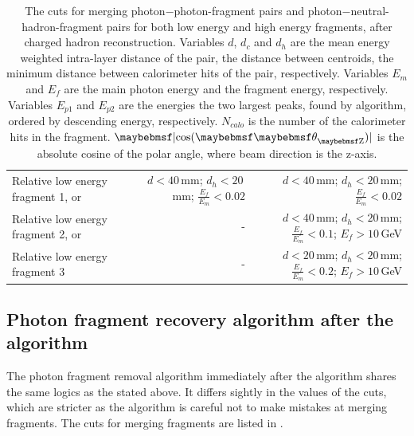 \begin{table}[htbp]
\begin{tabular}{l  r  r }
\multicolumn{1}{L{0.3\textwidth}}{Relative low energy fragment 1, or} & \multicolumn{1}{R{0.3\textwidth}}{$d < 40$\,mm; $d_h < 20$\,mm; $\frac{E_f}{E_m} < 0.02$} & \multicolumn{1}{R{0.3\textwidth}}{$d < 40$\,mm; $d_h < 20$\,mm; $\frac{E_f}{E_m} < 0.02$} \\
\multicolumn{1}{L{0.3\textwidth}}{Relative low energy fragment 2, or} & \multicolumn{1}{R{0.3\textwidth}}{-}  & \multicolumn{1}{R{0.3\textwidth}}{$d < 40$\,mm; $d_h < 20$\,mm; $\frac{E_f}{E_m} < 0.1$; $E_f > 10$\,GeV} \\
\multicolumn{1}{L{0.3\textwidth}}{Relative low energy fragment 3} & \multicolumn{1}{R{0.3\textwidth}}{-}  & \multicolumn{1}{R{0.3\textwidth}}{$d < 20$\,mm; $d_h < 20$\,mm; $\frac{E_f}{E_m} < 0.2$; $E_f > 10$\,GeV} \\
\hline
\hline
\end{tabular}

\caption[The cuts for photon fragment removal algorithm in the \ECAL.]%
{The cuts for merging photon$-$photon-fragment pairs and photon$-$neutral-hadron-fragment pairs for both low energy and high energy fragments, after charged hadron reconstruction. Variables $d$, $d_c$ and $d_h$ are the mean energy weighted intra-layer distance of the pair, the distance between centroids, the minimum distance between calorimeter hits of the pair, respectively. Variables $E_m$ and $E_f$ are the main photon energy and the fragment energy, respectively. Variables $E_{p1}$ and $E_{p2}$ are the energies the two largest peaks, found by \peakFinding algorithm, ordered by descending energy, respectively. $N_{calo}$ is the number of the calorimeter hits in the fragment. $\absCosTheta$ is the absolute cosine of the polar angle, where beam direction is the z-axis. }
\label{tab:photonFragRemovalCuts}
\end{table}

\subsection{Photon fragment recovery algorithm after the \PhotonReconstruction algorithm}

The photon fragment removal algorithm immediately after the \PhotonReconstruction algorithm shares the same logics as the stated above. It differs sightly in the values of the cuts, which are stricter as the algorithm is careful not to make mistakes at merging fragments. The cuts for merging fragments are listed in .



